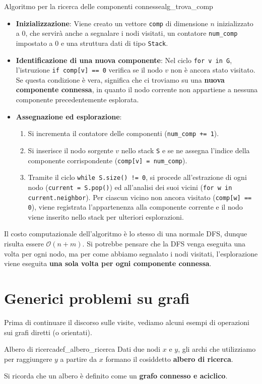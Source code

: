 \documentclass[12pt]{report}
\begin{document}
	\begin{algoritmo}{Algoritmo per la ricerca delle componenti connesse}{alg_trova_comp}		
		\begin{itemize}
			\item \textbf{Inizializzazione}: Viene creato un vettore \texttt{comp} di dimensione $n$ inizializzato a $0$, che servirà anche a segnalare i nodi visitati, un contatore \texttt{num\_comp} impostato a $0$ e una struttura dati di tipo \texttt{Stack}.
			
			\item \textbf{Identificazione di una nuova componente}: Nel ciclo \texttt{for v in G}, l'istruzione \texttt{if comp[v] == 0} verifica se il nodo $v$ non è ancora stato visitato. Se questa condizione è vera, significa che ci troviamo su una \textbf{nuova componente connessa}, in quanto il nodo corrente non appartiene a nessuna componente precedentemente esplorata.
			
			\item \textbf{Assegnazione ed esplorazione}:
			\begin{enumerate}
				\item Si incrementa il contatore delle componenti (\texttt{num\_comp += 1}).
				\item Si inserisce il nodo sorgente $v$ nello stack \texttt{S} e se ne assegna l'indice della componente corrispondente (\texttt{comp[v] = num\_comp}).
				\item Tramite il ciclo \texttt{while S.size() != 0}, si procede all'estrazione di ogni nodo (\texttt{current = S.pop()}) ed all'analisi dei suoi vicini (\texttt{for w in current.neighbor}). Per ciascun vicino non ancora visitato (\texttt{comp[w] == 0}), viene registrata l'appartenenza alla componente corrente e il nodo viene inserito nello stack per ulteriori esplorazioni.
			\end{enumerate}
		\end{itemize}
		
	\end{algoritmo}
	
	Il costo computazionale dell'algoritmo è lo stesso di una normale DFS, dunque risulta essere $\mathcal{O}(n+m)$. Si potrebbe pensare che la DFS venga eseguita una volta per ogni nodo, ma per come abbiamo segnalato i nodi visitati, l'esplorazione viene eseguita \textbf{una sola volta per ogni componente connessa}.
	
	\newpage
	\section{Generici problemi su grafi}
	Prima di continuare il discorso sulle visite, vediamo alcuni esempi di operazioni sui grafi diretti (o orientati).
	\begin{definizione}{Albero di ricerca}{def_albero_ricerca}
		Dati due nodi $x$ e $y$, gli archi che utilizziamo per raggiungere $y$ a partire da $x$ formano il cosiddetto \textbf{albero di ricerca}. 
		
		Si ricorda che un albero è definito come un \textbf{grafo connesso e aciclico}.
	\end{definizione}
	
\end{document}
